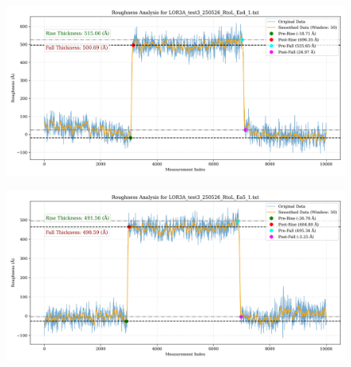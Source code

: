 \documentclass[platex,dvipdfmx,10pt,twoside,a4paper,jis2004]{jsarticle}
\begin{document}
\begin{figure}[H]
    \centering
    \includegraphics[width=\textwidth]{LOR3A_test3_250526_RtoL_Ea4_1.png}
    \label{fig:LOR3Atest3250526RtoLEa41}
\end{figure}
\begin{figure}[H]
    \centering
    \includegraphics[width=\textwidth]{LOR3A_test3_250526_RtoL_Ea5_1.png}
    \label{fig:LOR3Atest3250526RtoLEa51}
\end{figure}
\end{document}
